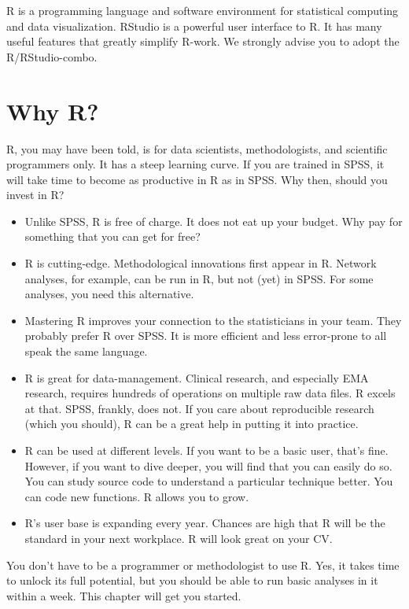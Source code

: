 \documentclass[]{book}
\begin{document}
R is a programming language and software environment for statistical
computing and data visualization. RStudio is a powerful user interface
to R. It has many useful features that greatly simplify R-work. We
strongly advise you to adopt the R/RStudio-combo.

\section{Why R?}\label{why-r}


R, you may have been told, is for data scientists, methodologists, and
scientific programmers only. It has a steep learning curve. If you are
trained in SPSS, it will take time to become as productive in R as in
SPSS. Why then, should you invest in R?

\begin{itemize}
\item
  Unlike SPSS, R is free of charge. It does not eat up your budget. Why
  pay for something that you can get for free?
\item
  R is cutting-edge. Methodological innovations first appear in R.
  Network analyses, for example, can be run in R, but not (yet) in SPSS.
  For some analyses, you need this alternative.
\item
  Mastering R improves your connection to the statisticians in your
  team. They probably prefer R over SPSS. It is more efficient and less
  error-prone to all speak the same language.
\item
  R is great for data-management. Clinical research, and especially EMA
  research, requires hundreds of operations on multiple raw data files.
  R excels at that. SPSS, frankly, does not. If you care about
  reproducible research (which you should), R can be a great help in
  putting it into practice.
\item
  R can be used at different levels. If you want to be a basic user,
  that's fine. However, if you want to dive deeper, you will find that
  you can easily do so. You can study source code to understand a
  particular technique better. You can code new functions. R allows you
  to grow.
\item
  R's user base is expanding every year. Chances are high that R will be
  the standard in your next workplace. R will look great on your CV.
\end{itemize}

You don't have to be a programmer or methodologist to use R. Yes, it
takes time to unlock its full potential, but you should be able to run
basic analyses in it within a week. This chapter will get you started.
\end{document}
